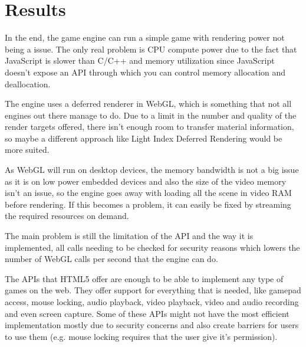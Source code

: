 \chapter{Results}
\label{chapter:Chapter 5}

In the end, the game engine can run a simple game with rendering power not being a issue. The only real problem is CPU compute power due to the fact that JavaScript is slower than C/C++ and memory utilization since JavaScript doesn’t expose an API through which you can control memory allocation and deallocation. 

The engine uses a deferred renderer in WebGL, which is something that not all engines out there manage to do. Due to a limit in the number and quality of the render targets offered, there isn't enough room to transfer material information, so maybe a different approach like Light Index Deferred Rendering would be more suited.

As WebGL will run on desktop devices, the memory bandwidth is not a big issue as it is on low power embedded devices and also the size of the video memory isn't an issue, so the engine goes away with loading all the scene in video RAM before rendering. If this becomes a problem, it can easily be fixed by streaming the required resources on demand.

The main problem is still the limitation of the API and the way it is implemented, all calls needing to be checked for security reasons which lowers the number of WebGL calls per second that the engine can do.

The APIs that HTML5 offer are enough to be able to implement any type of games on the web. They offer support for everything that is needed, like gamepad access, mouse locking, audio playback, video playback, video and audio recording and even screen capture. Some of these APIs might not have the most efficient implementation mostly due to security concerns and also create barriers for users to use them (e.g. mouse locking requires that the user give it's permission).